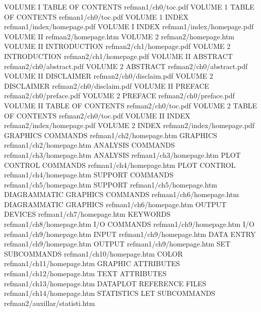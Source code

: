 VOLUME I TABLE OF CONTENTS              refman1/ch0/toc.pdf
VOLUME 1 TABLE OF CONTENTS              refman1/ch0/toc.pdf
VOLUME 1 INDEX                          refman1/index/homepage.pdf
VOLUME I INDEX                          refman1/index/homepage.pdf
VOLUME II                               refman2/homepage.htm
VOLUME 2                                refman2/homepage.htm
VOLUME II INTRODUCTION                  refman2/ch1/homepage.pdf
VOLUME 2 INTRODUCTION                   refman2/ch1/homepage.pdf
VOLUME II ABSTRACT                      refman2/ch0/abstract.pdf
VOLUME 2 ABSTRACT                       refman2/ch0/abstract.pdf
VOLUME II DISCLAIMER                    refman2/ch0/disclaim.pdf
VOLUME 2 DISCLAIMER                     refman2/ch0/disclaim.pdf
VOLUME II PREFACE                       refman2/ch0/preface.pdf
VOLUME 2 PREFACE                        refman2/ch0/preface.pdf
VOLUME II TABLE OF CONTENTS             refman2/ch0/toc.pdf
VOLUME 2 TABLE OF CONTENTS              refman2/ch0/toc.pdf
VOLUME II INDEX                         refman2/index/homepage.pdf
VOLUME 2 INDEX                          refman2/index/homepage.pdf
GRAPHICS COMMANDS                       refman1/ch2/homepage.htm
GRAPHICS                                refman1/ch2/homepage.htm
ANALYSIS COMMANDS                       refman1/ch3/homepage.htm
ANALYSIS                                refman1/ch3/homepage.htm
PLOT CONTROL COMMANDS                   refman1/ch4/homepage.htm
PLOT CONTROL                            refman1/ch4/homepage.htm
SUPPORT COMMANDS                        refman1/ch5/homepage.htm
SUPPORT                                 refman1/ch5/homepage.htm
DIAGRAMMATIC GRAPHICS COMMANDS          refman1/ch6/homepage.htm
DIAGRAMMATIC GRAPHICS                   refman1/ch6/homepage.htm
OUTPUT DEVICES                          refman1/ch7/homepage.htm
KEYWORDS                                refman1/ch8/homepage.htm
I/O COMMANDS                            refman1/ch9/homepage.htm
I/O                                     refman1/ch9/homepage.htm
INPUT                                   refman1/ch9/homepage.htm
DATA ENTRY                              refman1/ch9/homepage.htm
OUTPUT                                  refman1/ch9/homepage.htm
SET SUBCOMMANDS                         refman1/ch10/homepage.htm
COLOR                                   refman1/ch11/homepage.htm
GRAPHIC ATTRIBUTES                      refman1/ch12/homepage.htm
TEXT ATTRIBUTES                         refman1/ch13/homepage.htm
DATAPLOT REFERENCE FILES                refman1/ch14/homepage.htm
STATISTICS LET SUBCOMMANDS              refman2/auxillar/statisti.htm
